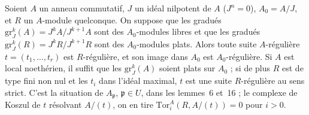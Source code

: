 \begin{encadre}
\begin{theoreme*}
Soient $A$ un anneau commutatif, $J$ un idéal nilpotent de $A$ ($J^n = 0$), $A_0 = A/J$, et $R$ un $A$-module quelconque. On suppose que les gradués $\mathrm{gr}^k_J(A) = J^kA/J^{k+1}A$ sont des $A_0$-modules libres et que les gradués $\mathrm{gr}^k_J(R) = J^kR/J^{k+1}R$ sont des $A_0$-modules plats. Alors toute suite $A$-régulière $t = (t_1, \ldots, t_r)$ est $R$-régulière, et son image dans $A_0$ est $A_0$-régulière. Si $A$ est local noethérien, il suffit que les $\mathrm{gr}^k_J(A)$ soient plats sur $A_0$ ; si de plus $R$ est de type fini non nul et les $t_i$ dans l'idéal maximal, $t$ est une suite $R$-régulière au sens strict. C'est la situation de $A_{\mathfrak p}$, $\mathfrak p \in U$, dans les lemmes~6 et~16 ; le complexe de Koszul de $t$ résolvant $A/(t)$, on en tire $\mathrm{Tor}_i^A(R, A/(t)) = 0$ pour $i > 0$.
\end{theoreme*}
\end{encadre}
